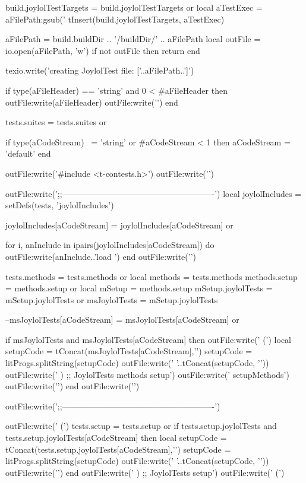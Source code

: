   build.joylolTestTargets = build.joylolTestTargets or { }
  local aTestExec = aFilePath:gsub('%
  tInsert(build.joylolTestTargets, aTestExec)

  aFilePath = build.buildDir .. '/buildDir/' .. aFilePath
  local outFile = io.open(aFilePath, 'w')
  if not outFile then
    return
  end
  
  texio.write('creating JoylolTest file: ['..aFilePath..']\n')
  
  if type(aFileHeader) == 'string'
    and 0 < #aFileHeader then
    outFile:write(aFileHeader)
    outFile:write('\n\n')
  end

  tests.suites = tests.suites or { }

  if type(aCodeStream) ~= 'string'
    or #aCodeStream < 1 then
    aCodeStream = 'default'
  end

  outFile:write('#include <t-contests.h>\n')
  outFile:write('\n\n')

  outFile:write(';;-------------------------------------------------------\n')
  local joylolIncludes = setDefs(tests, 'joylolIncludes')

  joylolIncludes[aCodeStream] = joylolIncludes[aCodeStream] or { }

  for i, anInclude in ipairs(joylolIncludes[aCodeStream]) do
    outFile:write(anInclude..'load \n')
  end
  outFile:write('\n\n')

  tests.methods = tests.methods or { }
  local methods = tests.methods
  methods.setup = methods.setup or { }
  local mSetup  = methods.setup
  mSetup.joylolTests = mSetup.joylolTests or { }
  msJoylolTests      = mSetup.joylolTests

  --msJoylolTests[aCodeStream] = msJoylolTests[aCodeStream] or { }

  if msJoylolTests and
    msJoylolTests[aCodeStream] then
    outFile:write('  (\n')
    local setupCode = tConcat(msJoylolTests[aCodeStream],'\n')
    setupCode       = litProgs.splitString(setupCode)
    outFile:write('  '..tConcat(setupCode, '\n  '))
    outFile:write('  ) ;; JoylolTests methods setup\n')
    outFile:write('  setupMethods\n')
    outFile:write('\n\n')
  end
  outFile:write('\n\n')

  outFile:write(';;-------------------------------------------------------\n')

  outFile:write('  (\n')
  tests.setup = tests.setup or { }
  if tests.setup.joylolTests and
    tests.setup.joylolTests[aCodeStream] then
    local setupCode = tConcat(tests.setup.joylolTests[aCodeStream],'\n')
    setupCode       = litProgs.splitString(setupCode)
    outFile:write('  '..tConcat(setupCode, '\n  '))
    outFile:write('\n\n')
  end
  outFile:write('  ) ;; JoylolTests setup\n')
  outFile:write('  (\n')

